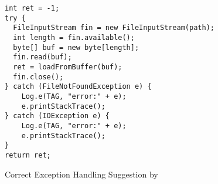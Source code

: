 \begin{figure}[t]
	\centering
\begin{lstlisting}[]
int ret = -1;
try {
  FileInputStream fin = new FileInputStream(path);
  int length = fin.available();
  byte[] buf = new byte[length];
  fin.read(buf);
  ret = loadFromBuffer(buf);
  fin.close();
} catch (FileNotFoundException e) {
    Log.e(TAG, "error:" + e);
    e.printStackTrace();
} catch (IOException e) {
    Log.e(TAG, "error:" + e);
    e.printStackTrace();
}
return ret;
\end{lstlisting}
        \vspace{-16pt}
        \caption{Correct Exception Handling Suggestion by {\tool}}
        \label{fig:example-experiment}
\end{figure}
